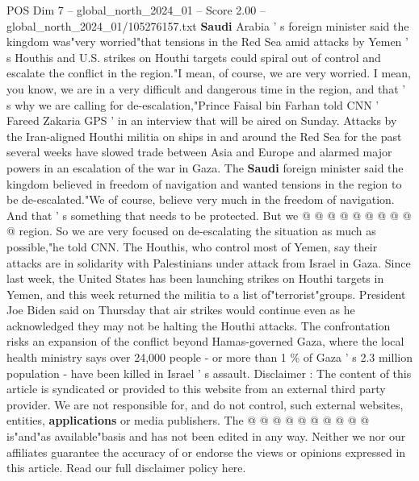 \begin{textsample}{POS Dim 7 – global\_north\_2024\_01 – Score 2.00 – global\_north\_2024\_01/105276157.txt}  \label{ex:f7_pos_245}
\textbf{Saudi} Arabia ' s foreign minister said the kingdom was"very worried"that tensions in the Red Sea amid attacks by Yemen ' s Houthis and U.S. strikes on Houthi targets could spiral out of control and escalate the conflict in the region."I mean, of course, we are very worried.
I mean, you know, we are in a very difficult and dangerous time in the region, and that ' s why we are calling for de-escalation,"Prince Faisal bin Farhan told CNN ' Fareed Zakaria GPS ' in an interview that will be aired on Sunday.
Attacks by the Iran-aligned Houthi militia on ships in and around the Red Sea for the past several weeks have slowed trade between Asia and Europe and alarmed major powers in an escalation of the war in Gaza.
The \textbf{Saudi} foreign minister said the kingdom believed in freedom of navigation and wanted tensions in the region to be de-escalated."We of course, believe very much in the freedom of navigation.
And that ' s something that needs to be protected.
But we @ @ @ @ @ @ @ @ @ @ region.
So we are very focused on de-escalating the situation as much as possible,"he told CNN.
The Houthis, who control most of Yemen, say their attacks are in solidarity with Palestinians under attack from Israel in Gaza.
Since last week, the United States has been launching strikes on Houthi targets in Yemen, and this week returned the militia to a list of"terrorist"groups.
President Joe Biden said on Thursday that air strikes would continue even as he acknowledged they may not be halting the Houthi attacks.
The confrontation risks an expansion of the conflict beyond Hamas-governed Gaza, where the local health ministry says over 24,000 people - or more than 1 \% of Gaza ' s 2.3 million population - have been killed in Israel ' s assault.
Disclaimer : The content of this article is syndicated or provided to this website from an external third party provider.
We are not responsible for, and do not control, such external websites, entities, \textbf{applications} or media publishers.
The @ @ @ @ @ @ @ @ @ @ is"and"as available"basis and has not been edited in any way.
Neither we nor our affiliates guarantee the accuracy of or endorse the views or opinions expressed in this article.
Read our full disclaimer policy here.

\end{textsample}
